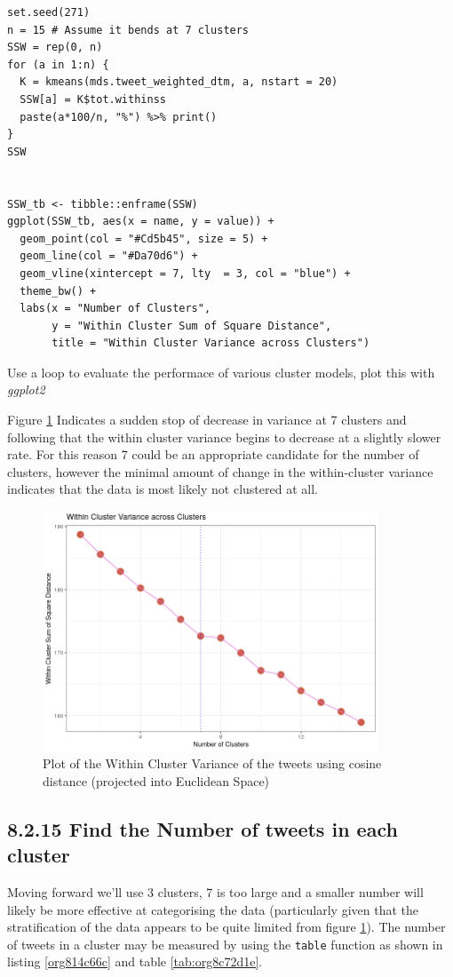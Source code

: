 \documentclass[11pt]{article}
\begin{document}
\begin{listing}[htbp]
\begin{verbatim}
set.seed(271)
n = 15 # Assume it bends at 7 clusters
SSW = rep(0, n)
for (a in 1:n) {
  K = kmeans(mds.tweet_weighted_dtm, a, nstart = 20)
  SSW[a] = K$tot.withinss
  paste(a*100/n, "%") %>% print()
}
SSW


SSW_tb <- tibble::enframe(SSW)
ggplot(SSW_tb, aes(x = name, y = value)) +
  geom_point(col = "#Cd5b45", size = 5) +
  geom_line(col = "#Da70d6") +
  geom_vline(xintercept = 7, lty  = 3, col = "blue") +
  theme_bw() +
  labs(x = "Number of Clusters",
       y = "Within Cluster Sum of Square Distance",
       title = "Within Cluster Variance across Clusters")
\end{verbatim}
\caption{\label{orgf7a5363}Use a loop to evaluate the performace of various cluster models, plot this with \emph{ggplot2}}
\end{listing}

Figure \ref{fig:orgb522eda} Indicates a sudden stop of decrease in variance at 7 clusters and following that the within cluster variance begins to decrease at a slightly slower rate. For this reason 7 could be an appropriate candidate for the number of clusters, however the minimal amount of change in the within-cluster variance indicates that the data is most likely not clustered at all.


\begin{figure}[htbp]
\centering
\includegraphics[width=10cm]{./Figures/Q14WithinClusterVariance.png}
\caption{\label{fig:orgb522eda}Plot of the Within Cluster Variance of the tweets using cosine distance (projected into Euclidean Space)}
\end{figure}

\subsection{8.2.15 Find the Number of tweets in each cluster}
\label{sec:org53cd7ed}
Moving forward we'll use 3 clusters, 7 is too large and a smaller number will likely be more effective at categorising the data (particularly given that the stratification of the data appears to be quite limited from figure \ref{fig:orgb522eda}). The number of tweets in a cluster may be measured by using the \texttt{table} function as shown in listing \ref{org814c66c} and table \ref{tab:org8c72d1e}.
\end{document}
